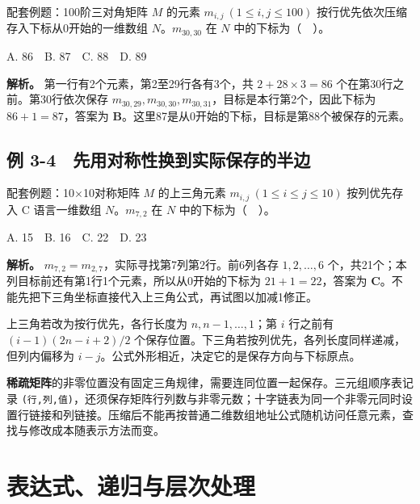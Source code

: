 \begin{example}[配套例题]

配套例题：100阶三对角矩阵 \(M\) 的元素 \(m_{i,j}\ (1\le i,j\le100)\) 按行优先依次压缩存入下标从0开始的一维数组 \(N\)。\(m_{30,30}\) 在 \(N\) 中的下标为（　）。

A. 86　B. 87　C. 88　D. 89

\end{example}

\textbf{解析。} 第一行有2个元素，第2至29行各有3个，共 \(2+28\times3=86\) 个在第30行之前。第30行依次保存 \(m_{30,29},m_{30,30},m_{30,31}\)，目标是本行第2个，因此下标为 \(86+1=87\)，答案为 \textbf{B}。这里87是从0开始的下标，目标是第88个被保存的元素。

\subsection{例 3-4　先用对称性换到实际保存的半边}\label{DS03-ex4}

\begin{example}[配套例题]

配套例题：10\ensuremath{\times}10对称矩阵 \(M\) 的上三角元素 \(m_{i,j}\ (1\le i\le j\le10)\) 按列优先存入 C 语言一维数组 \(N\)。\(m_{7,2}\) 在 \(N\) 中的下标为（　）。

A. 15　B. 16　C. 22　D. 23

\end{example}

\textbf{解析。} \(m_{7,2}=m_{2,7}\)，实际寻找第7列第2行。前6列各存 \(1,2,\ldots,6\) 个，共21个；本列目标前还有第1行1个元素，所以从0开始的下标为 \(21+1=22\)，答案为 \textbf{C}。不能先把下三角坐标直接代入上三角公式，再试图以加减1修正。

上三角若改为按行优先，各行长度为 \(n,n-1,\ldots,1\)；第 \(i\) 行之前有 \((i-1)(2n-i+2)/2\) 个保存位置。下三角若按列优先，各列长度同样递减，但列内偏移为 \(i-j\)。公式外形相近，决定它的是保存方向与下标原点。

\textbf{稀疏矩阵}的非零位置没有固定三角规律，需要连同位置一起保存。三元组顺序表记录 \texttt{(\allowbreak{}行,\allowbreak{}列,\allowbreak{}值)\allowbreak{}}，还须保存矩阵行列数与非零元数；十字链表为同一个非零元同时设置行链接和列链接。压缩后不能再按普通二维数组地址公式随机访问任意元素，查找与修改成本随表示方法而变。

\section{表达式、递归与层次处理}\label{DS03-07}

